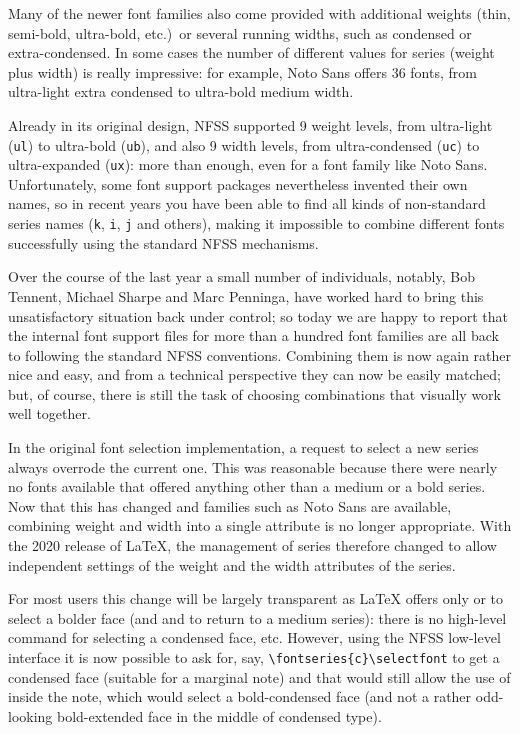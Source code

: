 \documentclass{ltnews}
\begin{document}
Many of the newer font families also come provided with additional
weights (thin, semi-bold, ultra-bold, etc.)\ or several running widths,
such as condensed or extra-condensed.  In some cases the number of
different values for series (weight plus width) is really impressive:
for example, Noto Sans
offers 36 fonts, from ultra-light extra condensed to ultra-bold medium width.

Already in its original design, NFSS supported 9 weight levels, from
ultra-light (\texttt{ul}) to ultra-bold (\texttt{ub}), and also 9 width
levels, from ultra-condensed (\texttt{uc}) to ultra-expanded
(\texttt{ux}):  more than enough, even for a font family like Noto
Sans. Unfortunately, some font support packages nevertheless invented
their own names, so in recent years you have been able to find all kinds of
non-standard series names (\texttt{k}, \texttt{i}, \texttt{j} and
others), making it impossible to combine different fonts successfully
using the standard NFSS mechanisms.

Over the course of the last year a small number of individuals,
notably, Bob Tennent, Michael Sharpe and Marc Penninga, have worked hard to
bring this unsatisfactory situation back under control; so today we are
happy to report that the internal font support files for more than a
hundred font families are all back to following the standard NFSS conventions.
Combining them is now again rather nice and easy, and from a technical
perspective they can now be easily matched; but, of course,
there is still the task of choosing combinations that visually work
well together.

In the original font selection implementation, a request to select a new series
always overrode the current one. This was reasonable because there
were nearly no fonts available that offered anything other than a
medium or a bold series. Now that this has changed and families such
as Noto Sans are available, combining weight and width into a single
attribute is no longer appropriate. With the 2020 release of \LaTeX{},
the management of series therefore changed to allow independent
settings of the weight and the width attributes of the series.

For most users this change will be largely transparent as \LaTeX{}
offers only  or  to select a bolder face (and
 and  to return to a medium series): there is no
high-level command for selecting a condensed face, etc. However, using
the NFSS low-level interface it is now possible to ask for, say,
\verb=\fontseries{c}\selectfont= to get a condensed
face (suitable for a marginal note) and that would still allow
the use of  inside the note, which would
select a bold-condensed face (and not a rather odd-looking
bold-extended face in the middle of condensed type).
\end{document}
